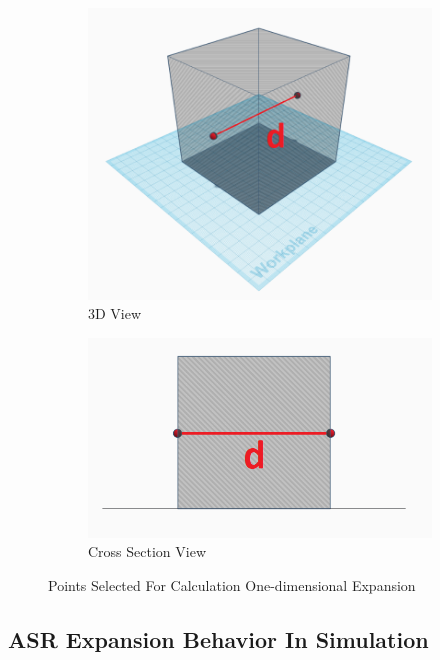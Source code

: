 \begin{figure}[h!]
\centering
\begin{subfigure}{.4\textwidth}
  \centering
  \includegraphics[width=1.0\linewidth]{Files/Method/dis0.png}
\caption{3D View}
\end{subfigure}%
\begin{subfigure}{.4\textwidth}
  \centering
  \includegraphics[width=1.0\linewidth]{Files/Method/dis1.png}
\caption{Cross Section View}
\end{subfigure}%
\caption{Points Selected For Calculation One-dimensional Expansion}
\label{twopoints}
\end{figure}

\subsection{ASR Expansion Behavior In Simulation}


